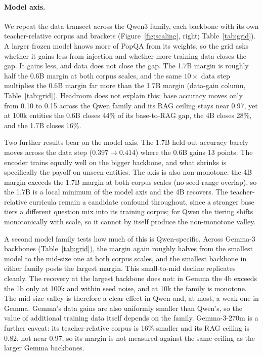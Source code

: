 \documentclass{article}
\newcommand{\popqa}{PopQA}
\begin{document}
\paragraph{Model axis.} We repeat the data transect across the Qwen3 family, each backbone
with its own teacher-relative corpus and brackets (Figure~\ref{fig:scaling}, right;
Table~\ref{tab:grid}). A larger frozen model knows more of \popqa{} from its weights, so the
grid asks whether it gains less from injection and whether more training data closes the gap.
It gains less, and data does not close the gap. The 1.7B margin is roughly half the 0.6B
margin at both corpus scales, and the same $10\times$ data step multiplies the 0.6B margin far
more than the 1.7B margin (data-gain column, Table~\ref{tab:grid}). Headroom does not explain
this: base accuracy moves only from 0.10 to 0.15 across the Qwen family and its RAG ceiling
stays near 0.97, yet at 100k entities the 0.6B closes 44\% of its base-to-RAG gap, the 4B closes
28\%, and the 1.7B closes 16\%.

Two further results bear on the model axis. The 1.7B held-out accuracy barely moves across the
data step ($0.397 \to 0.414$) where the 0.6B gains 13 points. The encoder trains equally well
on the bigger backbone, and what shrinks is specifically the payoff on unseen entities. The
axis is also non-monotone: the 4B margin exceeds the 1.7B margin at both corpus scales (no
seed-range overlap), so the 1.7B is a local minimum of the model axis and the 4B recovers. The
teacher-relative curricula remain a candidate confound throughout, since a stronger base tiers a
different question mix into its training corpus; for Qwen the tiering shifts monotonically with
scale, so it cannot by itself produce the non-monotone valley.

A second model family tests how much of this is Qwen-specific. Across Gemma-3 backbones
(Table~\ref{tab:grid}), the margin again roughly halves from the smallest model to the
mid-size one at both corpus scales, and the smallest backbone in either family posts the
largest margin. This small-to-mid decline replicates cleanly. The recovery at the largest
backbone does not: in Gemma the 4b exceeds the 1b only at 100k and within seed noise, and at
10k the family is monotone. The mid-size valley is therefore a clear effect in Qwen and, at
most, a weak one in Gemma. Gemma's data gains are also uniformly smaller than Qwen's, so the
value of additional training data itself depends on the family. Gemma-3-270m is a further
caveat: its teacher-relative corpus is 16\% smaller and its RAG ceiling is 0.82, not near 0.97,
so its margin is not measured against the same ceiling as the larger Gemma backbones.
\end{document}
